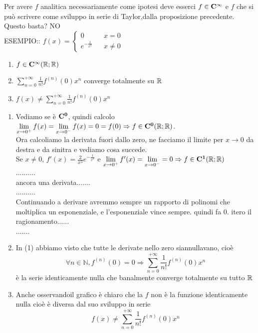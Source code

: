 Per avere $f$ analitica  necessariamente come ipotesi deve esserci $f\in \cntclass{\infty}$ e $f$ che si può scrivere come sviluppo in serie di Taylor,dalla proposizione precedente. Questo basta? NO\\
ESEMPIO:: $f(x)=\left\{\begin{matrix}0&& x=0\\e^{-\frac{1}{x^2}}&&x\ne 0\end{matrix}\right.$\\
\begin{center}
	\begin{tikzpicture}[scale=1]
	\end{tikzpicture}
\end{center}
\begin{enumerate}
	\item $f\in \cntclass{\infty}( \R; \R)$
	\item $\sum\limits_{n=0}^{+\infty}\frac{1}{n!}f^{(n)}(0)x^n$ converge totalmente su $ \R$
	\item $f(x)\ne\sum\limits_{n=0}^{+\infty}\frac{1}{n!}f^{(n)}(0)x^n$
\end{enumerate}
\begin{enumerate}
	\item Vediamo se è $\cntclass{0}$, quindi calcolo $\lim\limits_{x\to 0^{+}}f(x)=\lim\limits_{x\to 0^{-}}f(x)=0=f(0)\Rightarrow f\in \cntclass{0}( \R; \R)$.\\
	Ora calcoliamo la derivata fuori dallo zero, ne facciamo il limite per $x\to 0$ da destra e da sinitra e vediamo cosa succede.\\
	Se $x\ne 0$, $f'(x)=\frac{2}{x^3}e^{-\frac{1}{x^3}}$ e $\lim\limits_{x\to 0^{+}}f'(x)=\lim\limits_{x\to 0^{-}} = 0\Rightarrow f\in \cntclass{1}( \R; \R)$\\
	..........\\
	ancora una derivata.......\\
	..........\\
	Continuando a derivare  avremmo sempre un rapporto di polinomi che moltiplica un esponenziale, e l'esponenziale vince sempre. quindi fa $0$.
	itero il ragionamento......\\
	.......\\
	\item In (1) abbiamo visto  che tutte le derivate nello zero siannullavano, cioè 
	$$\forall n\in\mathbb{N}, f^{(n)}(0)=0\Rightarrow \sum\limits_{n=0}^{+\infty}\frac{1}{n!}f^{(n)}(0)x^n$$
	è la serie identicamente nulla  che banalmente converge totalmente su tutto $ \R$
	\item Anche osservandoil grafico è chiaro che la $f$ non è la funzione identicamente nulla cioè è diversa dal suo sviluppo in serie
	$$f(x)\ne\sum\limits_{n=0}^{+\infty}\frac{1}{n!}f^{(n)}(0)x^n$$
\end{enumerate}
